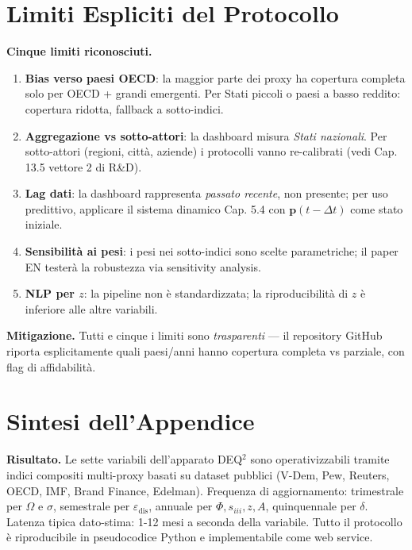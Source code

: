 \section{Limiti Espliciti del
Protocollo}\label{limiti-espliciti-del-protocollo}

\Conj{} \textbf{Cinque limiti riconosciuti.}

\begin{enumerate}
\def\labelenumi{\arabic{enumi}.}
\tightlist
\item
  \textbf{Bias verso paesi OECD}: la maggior parte dei proxy ha
  copertura completa solo per OECD + grandi emergenti. Per Stati piccoli
  o paesi a basso reddito: copertura ridotta, fallback a sotto-indici.
\item
  \textbf{Aggregazione vs sotto-attori}: la dashboard misura \emph{Stati
  nazionali}. Per sotto-attori (regioni, città, aziende) i protocolli
  vanno re-calibrati (vedi Cap. 13.5 vettore 2 di R\&D).
\item
  \textbf{Lag dati}: la dashboard rappresenta \emph{passato recente},
  non presente; per uso predittivo, applicare il sistema dinamico Cap.
  5.4 con \(\boldsymbol{p}(t-\Delta t)\) come stato iniziale.
\item
  \textbf{Sensibilità ai pesi}: i pesi nei sotto-indici sono scelte
  parametriche; il paper EN testerà la robustezza via sensitivity
  analysis.
\item
  \textbf{NLP per \(z\)}: la pipeline non è standardizzata; la
  riproducibilità di \(z\) è inferiore alle altre variabili.
\end{enumerate}

\Proved{} \textbf{Mitigazione.} Tutti e cinque i limiti sono
\emph{trasparenti} --- il repository GitHub riporta esplicitamente quali
paesi/anni hanno copertura completa vs parziale, con flag di
affidabilità.



\section{Sintesi dell'Appendice}\label{sintesi-dellappendice}

\Proved{} \textbf{Risultato.} Le sette variabili dell'apparato DEQ$^2$ sono
operativizzabili tramite indici compositi multi-proxy basati su dataset
pubblici (V-Dem, Pew, Reuters, OECD, IMF, Brand Finance, Edelman).
Frequenza di aggiornamento: trimestrale per \(\Omega\) e \(\sigma\),
semestrale per \(\varepsilon_{\text{dis}}\), annuale per
\(\Phi, s_{iii}, z, A\), quinquennale per \(\delta\). Latenza tipica
dato-stima: 1-12 mesi a seconda della variabile. Tutto il protocollo è
riproducibile in pseudocodice Python e implementabile come web service.

